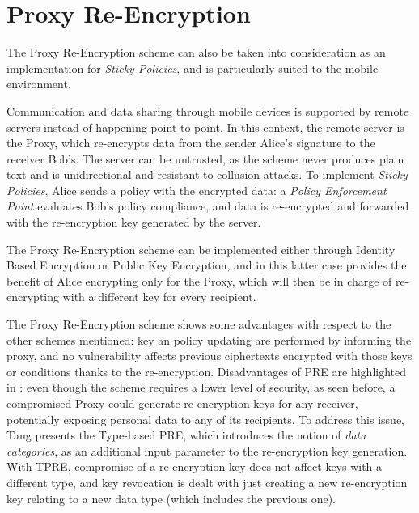 \section{Proxy Re-Encryption}
The Proxy Re-Encryption scheme \cite{green2007identity} can also be taken into consideration as an implementation for \textit{Sticky Policies}, and is particularly suited to the mobile environment.

Communication and data sharing through mobile devices is supported by remote servers instead of happening point-to-point. In this context, the remote server is the Proxy, which re-encrypts data from the sender Alice's signature to the receiver Bob's. The server can be untrusted, as the scheme never produces plain text and is unidirectional and resistant to collusion attacks. To implement \textit{Sticky Policies}, Alice sends a policy with the encrypted data: a \textit{Policy Enforcement Point} evaluates Bob's policy compliance, and data is re-encrypted and forwarded with the re-encryption key generated by the server.

The Proxy Re-Encryption scheme can be implemented either through Identity Based Encryption or Public Key Encryption, and in this latter case provides the benefit of Alice encrypting only for the Proxy, which will then be in charge of re-encrypting with a different key for every recipient.

The Proxy Re-Encryption scheme shows some advantages with respect to the other schemes mentioned: key an policy updating are performed by informing the proxy, and no vulnerability affects previous ciphertexts encrypted with those keys or conditions thanks to the re-encryption. Disadvantages of PRE are highlighted in \cite{tang2008using}: even though the scheme requires a lower level of security, as seen before, a compromised Proxy could generate re-encryption keys for any receiver, potentially exposing personal data to any of its recipients. To address this issue, Tang presents the Type-based PRE, which introduces the notion of \textit{data categories}, as an additional input parameter to the re-encryption key generation. With TPRE, compromise of a re-encryption key does not affect keys with a different type, and key revocation is dealt with just creating a new re-encryption key relating to a new data type (which includes the previous one).